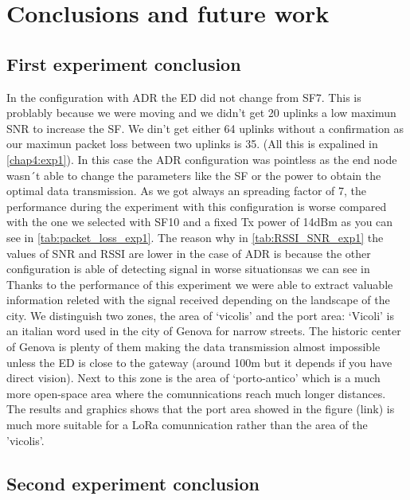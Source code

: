 \def\baselinestretch{1}
\chapter{Conclusions and future work}
\label{chap:conclusions}
\ifpdf
    \graphicspath{{Conclusions/Figures/PNG/}{Conclusions/Figures/PDF/}{Conclusions/Figures/}}
\else
    \graphicspath{{Conclusions/Figures/EPS/}{Conclusions/Figures/}}
\fi
\def\baselinestretch{1.0}

\section{First experiment conclusion}

In the configuration with ADR the ED did not change from SF7. This is problably because 
we were moving and we didn’t get 20 uplinks a low maximun SNR to increase the SF. We din’t 
get either 64 uplinks without a confirmation as our maximun packet loss between two uplinks 
is 35. (All this is expalined in \ref*{chap4:exp1}). In this case the ADR configuration was 
pointless as the end node wasn´t able to change the parameters like the SF or the power
to obtain the optimal data transmission. As we got always an spreading factor of 7, the performance 
during the experiment with this configuration is worse compared with the one we selected with SF10 
and a fixed Tx power of 14dBm as you can see in \ref*{tab:packet_loss_exp1}. The reason why in \ref*{tab:RSSI_SNR_exp1}
the values of SNR and RSSI are lower in the case of ADR is because the other configuration is able of detecting 
signal in worse situationsas we can see in \\
Thanks to the performance of this experiment we were able to extract 
valuable information releted with the signal received depending on the landscape of the city. 
We distinguish two zones, the area of ‘vicolis’ and the port area:
‘Vicoli’ is an italian word used in the city of Genova for narrow streets. The historic center of Genova 
is plenty of them making the data transmission almost impossible unless the ED
is close to the gateway (around 100m but it depends if you have direct vision). Next to this zone is the 
area of ‘porto-antico’ which is a much more open-space area where the comunnications reach much longer distances.
The results and graphics shows that the port area showed in the figure (link) is much more 
suitable for a LoRa comunnication rather than the area of the 'vicolis’.

\section{Second experiment conclusion}




